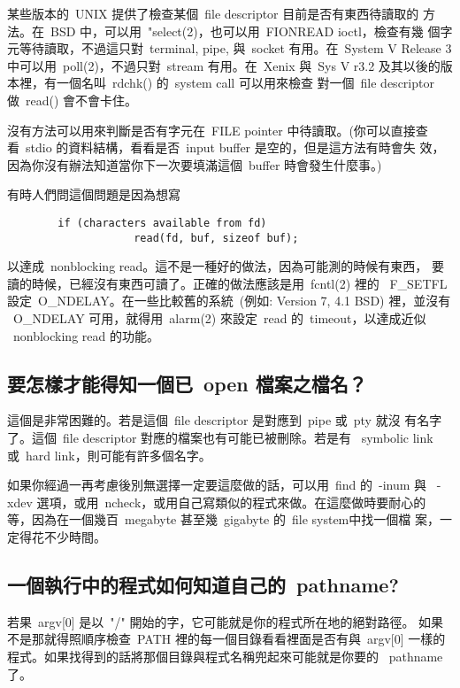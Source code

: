 \documentclass{article}
\begin{document}
\begin{CJK*}{Bg5}{ming}
	某些版本的~UNIX 提供了檢查某個~file descriptor 目前是否有東西待讀取的
        方法。在~BSD 中，可以用~"select(2)，也可以用~FIONREAD ioctl，檢查有幾
        個字元等待讀取，不過這只對~terminal, pipe, 與~socket 有用。在~System 
        V Release 3 中可以用~poll(2)，不過只對~stream 有用。在~Xenix 與~Sys V 
        r3.2 及其以後的版本裡，有一個名叫~rdchk() 的~system call 可以用來檢查
        對一個~file descriptor 做~read() 會不會卡住。

	沒有方法可以用來判斷是否有字元在~FILE pointer 中待讀取。(你可以直接查
	看~stdio 的資料結構，看看是否~input buffer 是空的，但是這方法有時會失
        效，因為你沒有辦法知道當你下一次要填滿這個~buffer 時會發生什麼事。)

	有時人們問這個問題是因為想寫
\begin{verbatim}
		if (characters available from fd)
                    read(fd, buf, sizeof buf);
\end{verbatim}
	以達成~nonblocking read。這不是一種好的做法，因為可能測的時候有東西，
        要讀的時候，已經沒有東西可讀了。正確的做法應該是用~fcntl(2) 裡的 
       ~F\_SETFL 設定~O\_NDELAY。在一些比較舊的系統~(例如: Version 7, 4.1 BSD)
	裡，並沒有 ~O\_NDELAY 可用，就得用~alarm(2) 來設定~read 的~timeout，以達成近似 
       ~nonblocking read 的功能。

\subsection{要怎樣才能得知一個已~open 檔案之檔名？}

	這個是非常困難的。若是這個~file descriptor 是對應到~pipe 或~pty 就沒
        有名字了。這個~file descriptor 對應的檔案也有可能已被刪除。若是有 
        ~symbolic link 或~hard link，則可能有許多個名字。
 
	如果你經過一再考慮後別無選擇一定要這麼做的話，可以用~find 的~-inum 與 
	~-xdev 選項，或用~ncheck，或用自己寫類似的程式來做。在這麼做時要耐心的
	等，因為在一個幾百~megabyte 甚至幾~gigabyte 的~file system中找一個檔
        案，一定得花不少時間。

\subsection{一個執行中的程式如何知道自己的~pathname?}

	若果~argv[0] 是以~"/" 開始的字，它可能就是你的程式所在地的絕對路徑。
        如果不是那就得照順序檢查~PATH 裡的每一個目錄看看裡面是否有與~argv[0]
        一樣的程式。如果找得到的話將那個目錄與程式名稱兜起來可能就是你要的
	~pathname 了。


\end{CJK*}
\end{document}
